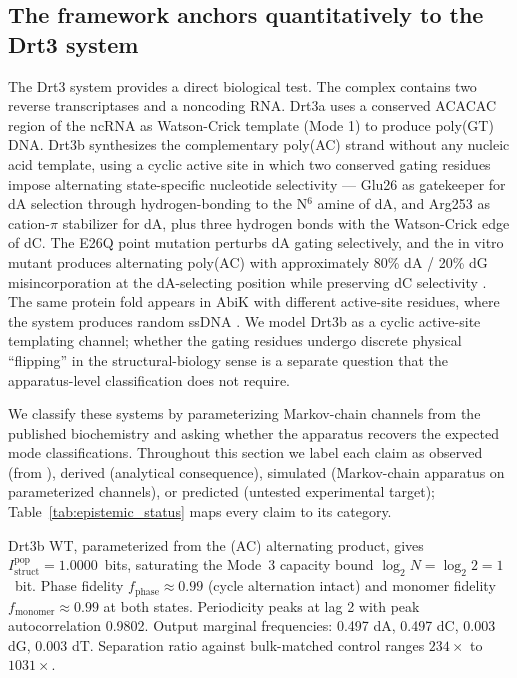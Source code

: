 \documentclass[aps,prx,reprint,amsmath,amssymb,floatfix,superscriptaddress,nofootinbib]{revtex4-2}
\theoremstyle{plain-thm}
\theoremstyle{definition-thm}
\newcommand{\Istructpop}{I_{\mathrm{struct}}^{\mathrm{pop}}}
\newcommand{\fphase}{f_{\mathrm{phase}}}
\newcommand{\fmonomer}{f_{\mathrm{monomer}}}
\begin{document}
\subsection{The framework anchors quantitatively to the Drt3 system}

The Drt3 system \citep{Deng2026} provides a direct biological test. The complex contains two reverse transcriptases and a noncoding RNA. Drt3a uses a conserved ACACAC region of the ncRNA as Watson-Crick template (Mode 1) to produce poly(GT) DNA. Drt3b synthesizes the complementary poly(AC) strand without any nucleic acid template, using a cyclic active site in which two conserved gating residues impose alternating state-specific nucleotide selectivity --- Glu26 as gatekeeper for dA selection through hydrogen-bonding to the N$^6$ amine of dA, and Arg253 as cation-$\pi$ stabilizer for dA, plus three hydrogen bonds with the Watson-Crick edge of dC. The E26Q point mutation perturbs dA gating selectively, and the in vitro mutant produces alternating poly(AC) with approximately 80\% dA / 20\% dG misincorporation at the dA-selecting position while preserving dC selectivity \citep[Fig. 4J]{Deng2026}. The same protein fold appears in AbiK with different active-site residues, where the system produces random ssDNA \citep{Deng2026}. We model Drt3b as a cyclic active-site templating channel; whether the gating residues undergo discrete physical ``flipping'' in the structural-biology sense is a separate question that the apparatus-level classification does not require.

We classify these systems by parameterizing Markov-chain channels from the published biochemistry and asking whether the apparatus recovers the expected mode classifications. Throughout this section we label each claim as observed (from \citet{Deng2026}), derived (analytical consequence), simulated (Markov-chain apparatus on parameterized channels), or predicted (untested experimental target); Table~\ref{tab:epistemic_status} maps every claim to its category.

Drt3b WT, parameterized from the (AC) alternating product, gives $\Istructpop = 1.0000$~bits, saturating the Mode~3 capacity bound $\log_2 N = \log_2 2 = 1$~bit. Phase fidelity $\fphase \approx 0.99$ (cycle alternation intact) and monomer fidelity $\fmonomer \approx 0.99$ at both states. Periodicity peaks at lag 2 with peak autocorrelation 0.9802. Output marginal frequencies: 0.497 dA, 0.497 dC, 0.003 dG, 0.003 dT. Separation ratio against bulk-matched control ranges $234\times$ to $1031\times$.
\end{document}
